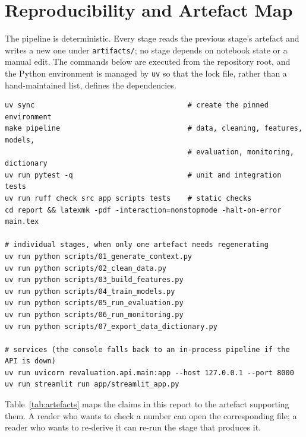 \section{Reproducibility and Artefact Map}
\label{app:reproducibility}

The pipeline is deterministic. Every stage reads the previous stage's artefact and
writes a new one under \texttt{artifacts/}; no stage depends on notebook state or a
manual edit. The commands below are executed from the repository root, and the Python
environment is managed by \texttt{uv} so that the lock file, rather than a
hand-maintained list, defines the dependencies.

\begin{verbatim}
uv sync                                    # create the pinned environment
make pipeline                              # data, cleaning, features, models,
                                           # evaluation, monitoring, dictionary
uv run pytest -q                           # unit and integration tests
uv run ruff check src app scripts tests    # static checks
cd report && latexmk -pdf -interaction=nonstopmode -halt-on-error main.tex

# individual stages, when only one artefact needs regenerating
uv run python scripts/01_generate_context.py
uv run python scripts/02_clean_data.py
uv run python scripts/03_build_features.py
uv run python scripts/04_train_models.py
uv run python scripts/05_run_evaluation.py
uv run python scripts/06_run_monitoring.py
uv run python scripts/07_export_data_dictionary.py

# services (the console falls back to an in-process pipeline if the API is down)
uv run uvicorn revaluation.api.main:app --host 127.0.0.1 --port 8000
uv run streamlit run app/streamlit_app.py
\end{verbatim}

Table~\ref{tab:artefacts} maps the claims in this report to the artefact supporting
them. A reader who wants to check a number can open the corresponding file; a reader
who wants to re-derive it can re-run the stage that produces it.

